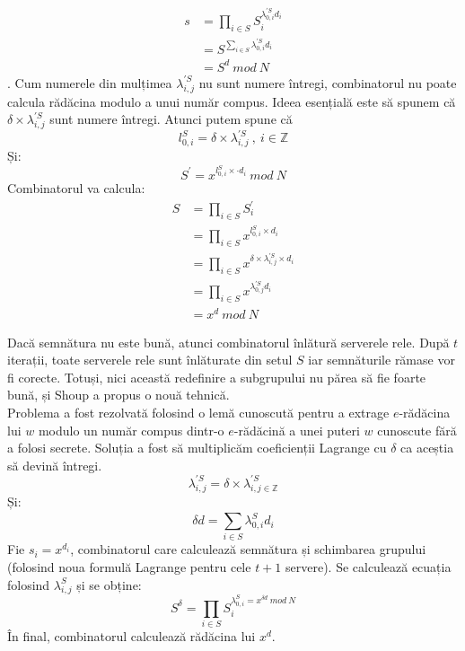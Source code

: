 \documentclass[12]{report}
\begin{document}
\begin{align*}
s&=\prod_{i \in S}^{} S_{i}^{\lambda_{0,i}^{'S} d_i}\\
 &= S^{\sum_{i \in S}^{}\lambda_{0,i}^{'S} d_i} \\
 &= S^d \ mod \ N
\end{align*}
.
Cum numerele din mulțimea $ \lambda_{i,j}^{'S}$ nu sunt numere întregi, combinatorul nu poate calcula rădăcina modulo a unui număr compus. Ideea esențială este să spunem că $\delta \times \lambda_{i,j}^{'S}$ sunt numere întregi. Atunci putem spune că 
$$l_{0,i}^{S} = \delta \times \lambda_{i,j}^{'S} \ , \ i \in \mathbb{Z} $$
Și:
$$ S^{'} = x^{l_{0,i}^{S} \times \cdot   d_i } \ mod \ N   $$
Combinatorul va calcula:
\begin{align*}
S &= \prod_{i \in S}^{} S_{i}^{'}\\ 
&= \prod_{i \in S}^{} x^{l_{0,i}^{S} \times d_i    } \\
 &= \prod_{i \in S}^{}  x^{\delta \times \lambda_{i,j}^{'S} \times d_i} \\ 
 &= \prod_{i \in S}^{} 
x^{\lambda_{0,j}^{'S} d_i}\\ &= x^d \ mod \ N  
\end{align*}


Dacă semnătura nu este bună, atunci combinatorul înlătură serverele rele. După $t$ iterații, toate serverele rele sunt înlăturate din setul $S$ iar semnăturile rămase vor fi corecte. Totuși, nici această redefinire a subgrupului nu părea să fie foarte bună, și Shoup a propus o nouă tehnică. \\
Problema a fost rezolvată folosind o lemă cunoscută pentru a extrage $e$-rădăcina lui $w$ modulo un număr compus dintr-o $e$-rădăcină a unei puteri $w$ cunoscute fără a folosi secrete. Soluția a fost să multiplicăm coeficienții Lagrange cu $\delta$ ca aceștia să devină întregi. 
$$ \lambda_{i,j}^{'S} = \delta \times \lambda_{i,j \in \mathbb{Z}}^{'S} $$
Și:
$$ \delta d = \sum_{i \in S}^{} \lambda_{0,i}^{S} d_i $$
Fie $ s_i = x^{d_i} $, combinatorul care calculează semnătura și schimbarea grupului (folosind noua formulă Lagrange pentru cele $t+1$ servere). Se calculează ecuația folosind $\lambda_{i,j}^{S} $ și se obține:
$$S^{\delta} = \prod_{i \in S}^{} S_{i}^{\lambda_{0,i}^{S} = x^{\delta d} \ mod \ N}$$
În final, combinatorul calculează rădăcina lui $x^d$.
\end{document}
